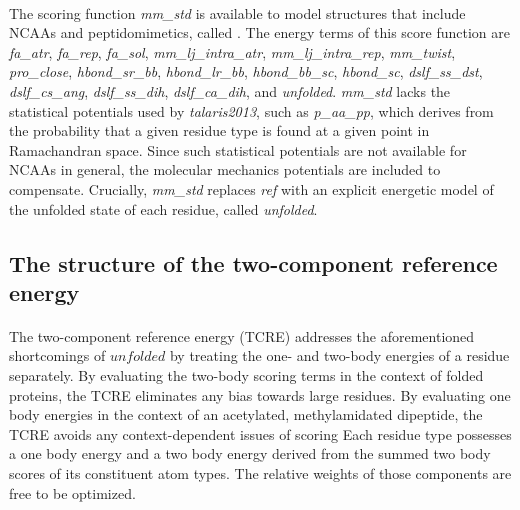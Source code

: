 \paragraph{}
The scoring function \textit{mm\_std} is available to model structures that include NCAAs and peptidomimetics, called \cite{renfrew_incorporation_2012}.
The energy terms of this score function are \textit{fa\_atr}, \textit{fa\_rep}, \textit{fa\_sol}, \textit{mm\_lj\_intra\_atr}, \textit{mm\_lj\_intra\_rep}, \textit{mm\_twist}, \textit{pro\_close}, \textit{hbond\_sr\_bb}, \textit{hbond\_lr\_bb}, \textit{hbond\_bb\_sc}, \textit{hbond\_sc}, \textit{dslf\_ss\_dst}, \textit{dslf\_cs\_ang}, \textit{dslf\_ss\_dih}, \textit{dslf\_ca\_dih}, and \textit{unfolded}.
\textit{mm\_std} lacks the statistical potentials used by \textit{talaris2013}, such as \textit{p\_aa\_pp}, which derives from the probability that a given residue type is found at a given point in Ramachandran space.
Since such statistical potentials are not available for NCAAs in general, the molecular mechanics potentials are included to compensate.
Crucially, \textit{mm\_std} replaces \textit{ref} with an explicit energetic model of the unfolded state of each residue, called \textit{unfolded}.

\subsection{The structure of the two-component reference energy}
\paragraph{}
The two-component reference energy (TCRE) addresses the aforementioned shortcomings of $unfolded$ by treating the one- and two-body energies of a residue separately.
By evaluating the two-body scoring terms in the context of folded proteins, the TCRE eliminates any bias towards large residues.
By evaluating one body energies in the context of an acetylated, methylamidated dipeptide, the TCRE avoids any context-dependent issues of scoring
Each residue type possesses a one body energy and a two body energy derived from the summed two body scores of its constituent atom types.
The relative weights of those components are free to be optimized.

